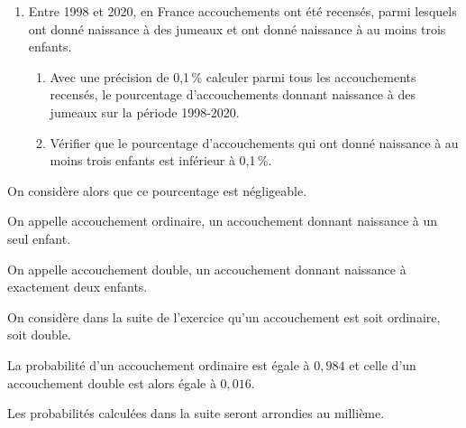 \medskip

\begin{enumerate}
\item Entre 1998 et 2020, en France  accouchements ont été recensés, parmi lesquels
 ont donné naissance à des jumeaux et  ont donné naissance à au moins trois enfants.
	\begin{enumerate}
		\item Avec une précision de 0,1\,\% calculer parmi tous les accouchements recensés, le pourcentage d'accouchements donnant naissance à des jumeaux sur la période 1998-2020.
		\item Vérifier que le pourcentage d'accouchements qui ont donné naissance à au moins trois enfants est inférieur à 0,1\,\%.
\end{enumerate}
\end{enumerate}

On considère alors que ce pourcentage est négligeable.

On appelle accouchement ordinaire, un accouchement donnant naissance à un seul enfant.

On appelle accouchement double, un accouchement donnant naissance à exactement deux enfants.

On considère dans la suite de l'exercice qu'un accouchement est soit ordinaire, soit double.

La probabilité d'un accouchement ordinaire est égale à $0,984$ et celle d'un accouchement double est alors égale à $0,016$.

Les probabilités calculées dans la suite seront arrondies au millième.

